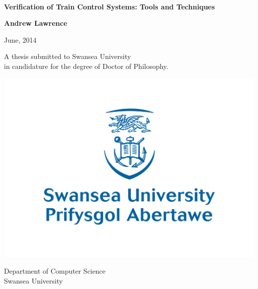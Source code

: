 \documentclass[11pt, a4paper, twoside, openright]{book}
\begin{document}
${ \ } $ \vspace{4cm}
%
%


\begin{center}
{\huge \bf Verification of Train Control Systems: Tools and Techniques}
\end{center}

\begin{center}
{\large \bf Andrew Lawrence}
\end{center}

\begin{center}
June, 2014
\end{center}

\vspace{2.5cm}



\vfill

\begin{center}
A thesis submitted to Swansea University\\
in candidature for the degree of Doctor of Philosophy.
\end{center}

\begin{center}
\includegraphics[scale=0.4]{logo} 
\end{center}

\begin{center}
Department of Computer Science\\
Swansea University
\end{center}
\end{document}

